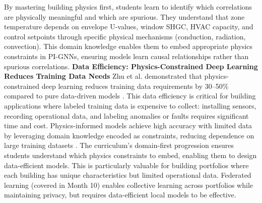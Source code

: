\documentclass[12pt,a4paper]{article}
\begin{document}
By mastering building physics first, students learn to identify which correlations are physically meaningful and which are spurious. They understand that zone temperature depends on envelope U-values, window SHGC, HVAC capacity, and control setpoints through specific physical mechanisms (conduction, radiation, convection). This domain knowledge enables them to embed appropriate physics constraints in PI-GNNs, ensuring models learn causal relationships rather than spurious correlations.
\textbf{Data Efficiency: Physics-Constrained Deep Learning Reduces Training Data Needs}
Zhu et al. demonstrated that physics-constrained deep learning reduces training data requirements by 30--50\% compared to pure data-driven models \cite{ref265}. This data efficiency is critical for building applications where labeled training data is expensive to collect: installing sensors, recording operational data, and labeling anomalies or faults requires significant time and cost. Physics-informed models achieve high accuracy with limited data by leveraging domain knowledge encoded as constraints, reducing dependence on large training datasets \cite{ref265}.
The curriculum's domain-first progression ensures students understand which physics constraints to embed, enabling them to design data-efficient models. This is particularly valuable for building portfolios where each building has unique characteristics but limited operational data. Federated learning (covered in Month 10) enables collective learning across portfolios while maintaining privacy, but requires data-efficient local models to be effective.
\end{document}

